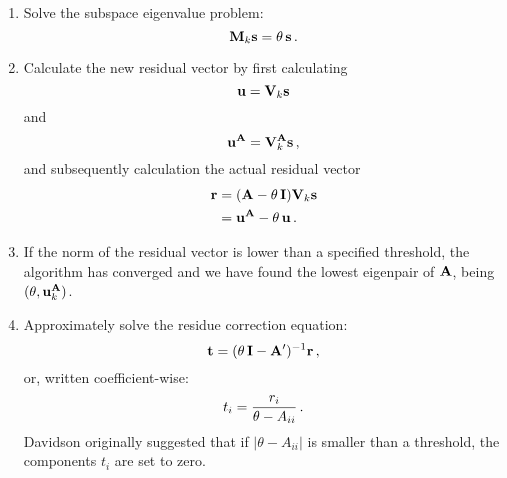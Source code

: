 \begin{enumerate}
            \item Solve the subspace eigenvalue problem:
                \begin{equation}
                    \vb{M}_k \vb{s} = \theta \thinspace \vb{s} \thinspace .
                \end{equation}

            \item Calculate the new residual vector by first calculating
                \begin{equation}
                    \vb{u} = \vb{V}_k \vb{s}
                \end{equation}
                and
                \begin{equation}
                    \vb{u}^{\vb{A}} = \vb{V}_k^{\vb{A}} \vb{s} \thinspace ,
                \end{equation}
                and subsequently calculation the actual residual vector
                \begin{align}
                    \vb{r} &= (\vb{A} - \theta \thinspace \vb{I}) \vb{V}_k \vb{s} \\
                    &= \vb{u}^{\vb{A}} - \theta \thinspace \vb{u} \thinspace .
                \end{align}

            \item If the norm of the residual vector is lower than a specified threshold, the algorithm has converged and we have found the lowest eigenpair of $\vb{A}$, being $(\theta, \vb{u}_k^{\vb{A}})$.

            \item Approximately solve the residue correction equation:
                \begin{equation}
                    \vb{t} = (\theta \thinspace \vb{I} - \vb{A}')^{-1} \vb{r} \thinspace ,
                \end{equation}
                or, written coefficient-wise:
                \begin{equation}
                    t_i = \frac{r_i}{\theta - A_{ii}} \thinspace .
                \end{equation}
                Davidson originally suggested that if $|\theta - A_{ii}|$ is smaller than a threshold, the components $t_i$ are set to zero.
        \end{enumerate}
